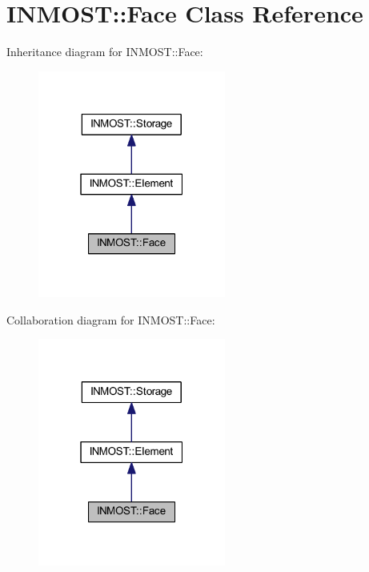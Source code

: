 \hypertarget{classINMOST_1_1Face}{\section{I\-N\-M\-O\-S\-T\-:\-:Face Class Reference}
\label{classINMOST_1_1Face}
}


Inheritance diagram for I\-N\-M\-O\-S\-T\-:\-:Face\-:\nopagebreak
\begin{figure}[H]
\begin{center}
\leavevmode
\includegraphics[width=175pt]{classINMOST_1_1Face__inherit__graph}
\end{center}
\end{figure}


Collaboration diagram for I\-N\-M\-O\-S\-T\-:\-:Face\-:\nopagebreak
\begin{figure}[H]
\begin{center}
\leavevmode
\includegraphics[width=175pt]{classINMOST_1_1Face__coll__graph}
\end{center}
\end{figure}
